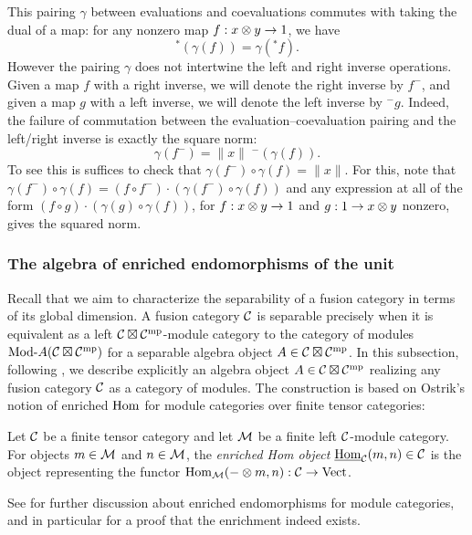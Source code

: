 \documentclass{amsart}
\begin{document}
This pairing $\gamma$ between evaluations and coevaluations commutes with taking the dual of a map: for any nonzero map $f: x \otimes y \rightarrow 1$, we have
\[
{}^*(\gamma(f)) = \gamma({}^* f).
\]
However the pairing $\gamma$ does not intertwine the left and right inverse operations.  Given a map $f$ with a right inverse, we will denote the right inverse by $f^{-}$, and given a map $g$ with a left inverse, we will denote the left inverse by ${}^- \!g$.  Indeed, the failure of commutation between the evaluation--coevaluation pairing and the left/right inverse is exactly the square norm:
\[
\gamma(f^{-}) = \lVert x \rVert \;{}^-\!(\gamma(f)).
\]
To see this is suffices to check that $\gamma(f^{-}) \circ \gamma(f) = \lVert x \rVert$.  For this, note that $\gamma(f^{-}) \circ \gamma(f) = (f \circ f^{-}) \cdot (\gamma(f^{-}) \circ \gamma(f))$ and any expression at all of the form $(f \circ g) \cdot (\gamma(g) \circ \gamma(f))$, for $f: x \otimes y \rightarrow 1$ and $g: 1 \rightarrow x \otimes y$ nonzero, gives the squared norm.


\subsubsection{The algebra of enriched endomorphisms of the unit} \label{sec:enrichedendo}

Recall that we aim to characterize the separability of a fusion category in terms of its global dimension.  A fusion category $\mathcal C$ is separable precisely when it is equivalent as a left $\mathcal C \boxtimes \mathcal C^{\mathrm{mp}}$-module category to the category of modules $\Mod{}{A}(\cC \boxtimes \cC^\mp)$ for a separable algebra object $A \in \mathcal C \boxtimes \mathcal C^{\mathrm{mp}}$.    In this subsection, following \cite{MR2097289}, we describe explicitly an algebra object $A \in \mathcal C \boxtimes \mathcal C^{\mathrm{mp}}$ realizing any fusion category $\mathcal C$ as a category of modules.  The construction is based on Ostrik's notion of enriched $\operatorname{Hom}$ for module categories over finite tensor categories: 
\begin{definition}
Let $\mathcal C$ be a finite tensor category and let $\mathcal M$ be a finite left $\mathcal C$-module category.  For objects $m \in \mathcal M$ and $n \in \mathcal M$, the \emph{enriched Hom object} $\operatorname{\underline{Hom}}_\mathcal C(m,n) \in \mathcal C$ is the object representing the functor $\operatorname{Hom}_\mathcal M(- \otimes m,n): \mathcal C \rightarrow \mathrm{Vect}$.
\end{definition}
\nid See \cite{MR1976459, EO-ftc, EGNO, BTP} for further discussion about enriched endomorphisms for module categories, and in particular for a proof that the enrichment indeed exists.
\end{document}

